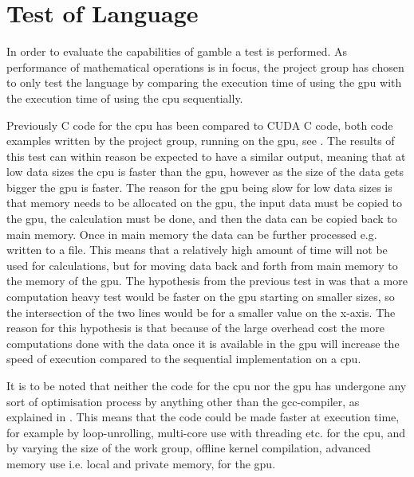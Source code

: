 \chapter{Test of Language} %
\label{cha:test_of_language}
In order to evaluate the capabilities of \gls{gamble} a test is performed. 
As performance of mathematical operations is in focus, the project group has chosen to only test the language by comparing the execution time of using the \acrshort{gpu} with the execution time of using the \acrshort{cpu} sequentially. 

Previously C code for the \acrshort{cpu} has been compared to CUDA C code, both code examples written by the project group, running on the \acrshort{gpu}, see .
The results of this test can within reason be expected to have a similar output, meaning that at low data sizes the \acrshort{cpu} is faster than the \acrshort{gpu}, however as the size of the data gets bigger the \acrshort{gpu} is faster.
The reason for the \acrshort{gpu} being slow for low data sizes is that memory needs to be allocated on the \acrshort{gpu}, the input data must be copied to the \acrshort{gpu}, the calculation must be done, and then the data can be copied back to main memory. 
Once in main memory the data can be further processed e.g. written to a file. 
This means that a relatively high amount of time will not be used for calculations, but for moving data back and forth from main memory to the memory of the \acrshort{gpu}.
The hypothesis from the previous test in  was that a more computation heavy test would be faster on the \acrshort{gpu} starting on smaller sizes, so the intersection of the two lines would be for a smaller value on the x-axis. 
The reason for this hypothesis is that because of the large overhead cost the more computations done with the data once it is available in the \acrshort{gpu} will increase the speed of execution compared to the sequential implementation on a \acrshort{cpu}.

It is to be noted that neither the code for the \acrshort{cpu} nor the \acrshort{gpu} has undergone any sort of optimisation process by anything other than the gcc-compiler, as explained in . 
This means that the code could be made faster at execution time, for example by loop-unrolling, multi-core use with threading etc. for the \acrshort{cpu}, and by varying the size of the work group, offline kernel compilation, advanced memory use i.e. local and private memory, for the \acrshort{gpu}.  

